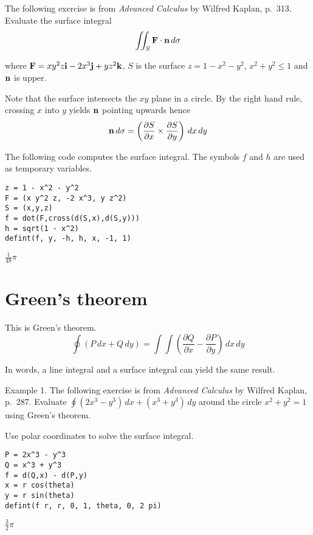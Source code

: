 \documentclass[12pt]{article}
\begin{document}
\bigskip
The following exercise is from
{\it Advanced Calculus} by Wilfred Kaplan, p.~313.
Evaluate the surface integral
$$\int\!\!\!\int_S{\bf F\cdot n}\,d\sigma$$

where ${\bf F}=xy^2z{\bf i}-2x^3{\bf j}+yz^2{\bf k}$, $S$ is the surface
$z=1-x^2-y^2$, $x^2+y^2\le1$ and $\bf n$ is upper.

\bigskip
Note that the surface intersects the $xy$ plane in a circle.
By the right hand rule, crossing $x$ into $y$ yields $\bf n$ pointing upwards hence
$${\bf n}\,d\sigma=\left({\frac{\partial S}{\partial x}\times\frac{\partial S}{\partial y}}\right)\,dx\,dy$$

The following code computes the surface integral.
The symbols $f$ and $h$ are used as temporary variables.

{\color{blue}
\begin{verbatim}
z = 1 - x^2 - y^2
F = (x y^2 z, -2 x^3, y z^2)
S = (x,y,z)
f = dot(F,cross(d(S,x),d(S,y)))
h = sqrt(1 - x^2)
defint(f, y, -h, h, x, -1, 1)
\end{verbatim}
}

$\displaystyle \tfrac{1}{48}\pi$

\newpage

\section{Green's theorem}

This is Green's theorem.
\begin{equation*}
\oint\left(P\,dx+Q\,dy\right)
=\int\!\!\!\int
\left(\frac{\partial Q}{\partial x}-\frac{\partial P}{\partial y}\right)
\,dx\,dy
\end{equation*}

In words, a line integral and a surface integral can yield
the same result.

\bigskip
Example 1.
The following exercise is from {\it Advanced Calculus}
by Wilfred Kaplan, p.~287.
Evaluate $\oint (2x^3-y^3)\,dx+(x^3+y^3)\,dy$ around the circle
$x^2+y^2=1$ using Green's theorem.

\bigskip
Use polar coordinates to solve the surface integral.

{\color{blue}
\begin{verbatim}
P = 2x^3 - y^3
Q = x^3 + y^3
f = d(Q,x) - d(P,y)
x = r cos(theta)
y = r sin(theta)
defint(f r, r, 0, 1, theta, 0, 2 pi)
\end{verbatim}
}

$\displaystyle \tfrac{3}{2}\pi$
\end{document}
